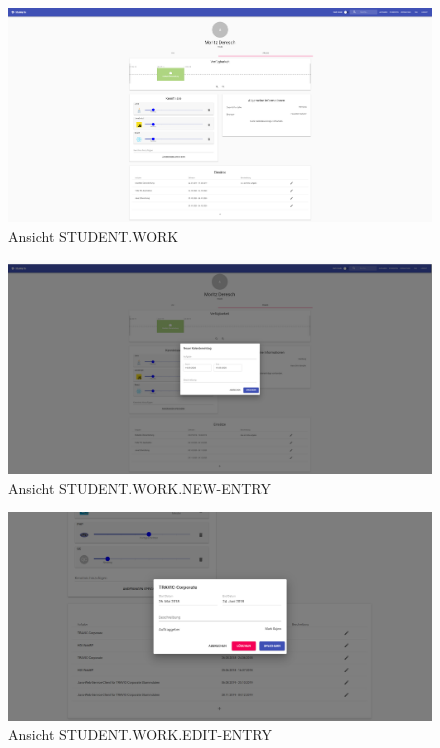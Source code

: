 \documentclass[
  12pt,
  ngerman,
  a4paper,
]{article}
\begin{document}
\begin{figure}
\centering
\includegraphics{./tex2pdf.-c803d322dfea80aa/3fcf93b7c7c70c0ec7ba98351dd035514a9bc92b.png}
\caption{Ansicht STUDENT.WORK}
\end{figure}

\begin{figure}
\centering
\includegraphics{./tex2pdf.-c803d322dfea80aa/e861a0f50de01e967b15da07f60cce10b9c4e729.png}
\caption{Ansicht STUDENT.WORK.NEW-ENTRY}
\end{figure}

\begin{figure}
\centering
\includegraphics{./tex2pdf.-c803d322dfea80aa/4c63a93237317c668e20509da7541b02094f7800.png}
\caption{Ansicht STUDENT.WORK.EDIT-ENTRY}
\end{figure}
\end{document}
